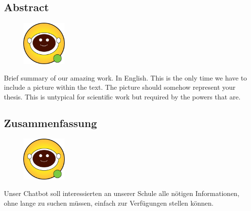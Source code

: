 \begin{spacing}{1}
    \chapter*{Abstract}
\end{spacing}
\begin{figure}
    \begin{center}
      \includegraphics[width=0.2\textwidth]{pics/leon.png}
    \end{center}
\end{figure}
Brief summary of our amazing work. In English.
This is the only time we have to include a picture within the text.
The picture should somehow represent your thesis.
This is untypical for scientific work but required by the powers that are.
\lipsum[6]
\newpage
\begin{spacing}{1}
    \chapter*{Zusammenfassung}
\end{spacing}
\begin{figure}
    \begin{center}
      \includegraphics[width=0.2\textwidth]{pics/leon.png}
    \end{center}
\end{figure}
Unser Chatbot soll interessierten an unserer Schule alle nötigen Informationen, ohne lange zu suchen müssen, einfach zur Verfügungen stellen können.
